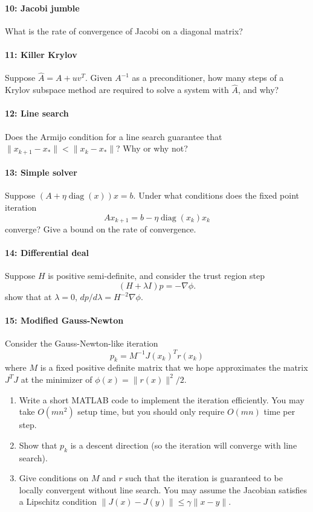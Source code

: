 \documentclass[12pt, leqno]{article}
\begin{document}
\paragraph{10: Jacobi jumble}
What is the rate of convergence of Jacobi on a diagonal matrix?

\paragraph{11: Killer Krylov}
Suppose $\hat{A} = A + uv^T$.  Given $A^{-1}$ as a preconditioner,
how many steps of a Krylov subspace method are required to solve
a system with $\hat{A}$, and why?

\paragraph{12: Line search}
Does the Armijo condition for a line search guarantee that
$\|x_{k+1}-x_*\| < \|x_k-x_*\|$?  Why or why not?

\paragraph*{13: Simple solver}
Suppose $(A + \eta \operatorname{diag}(x)) x = b$.  Under what
conditions does the fixed point iteration
\[
  A x_{k+1} = b - \eta \operatorname{diag}(x_k) x_k
\]
converge?  Give a bound on the rate of convergence.

\paragraph{14: Differential deal}
Suppose $H$ is positive semi-definite, and consider the trust region
step
\[
  (H + \lambda I) p = -\nabla \phi.
\]
show that at $\lambda = 0$, $dp/d\lambda = H^{-2} \nabla \phi$.

\paragraph{15: Modified Gauss-Newton}
Consider the Gauss-Newton-like iteration
\[
  p_k = M^{-1} J(x_k)^T r(x_k)
\]
where $M$ is a fixed positive definite matrix that we hope
approximates the matrix $J^T J$ at the minimizer of $\phi(x) =
\|r(x)\|^2/2$.
\begin{enumerate}
\item Write a short MATLAB code to implement the iteration
  efficiently.  You may take $O(m n^2)$ setup time, but you should
  only require $O(mn)$ time per step.
\item Show that $p_k$ is a descent direction (so the iteration will
  converge with line search).
\item Give conditions on $M$ and $r$ such that the iteration is guaranteed
  to be locally convergent without line search.  You may assume
  the Jacobian satisfies a Lipschitz condition
  $\|J(x)-J(y)\| \leq \gamma \|x-y\|$.
\end{enumerate}
\end{document}
